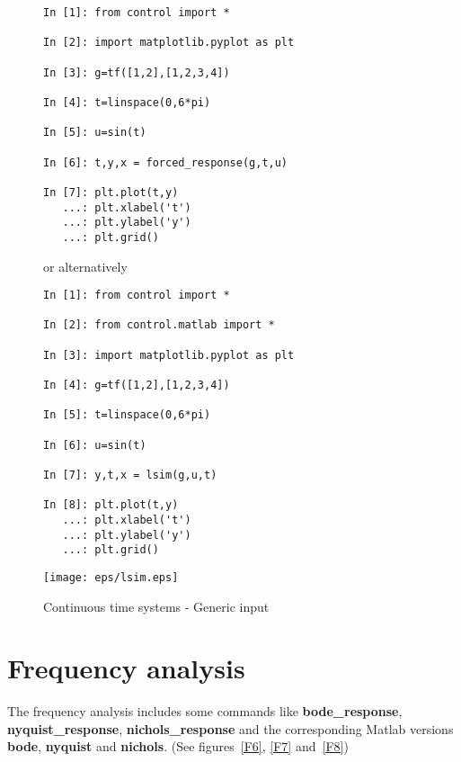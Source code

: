 \begin{figure}[htbp]  %
\begin{minipage}[t]{0.55\textwidth}
  \vspace{0pt}
\begin{lstlisting}[linewidth=7cm,xleftmargin=0cm]
In [1]: from control import *

In [2]: import matplotlib.pyplot as plt

In [3]: g=tf([1,2],[1,2,3,4])

In [4]: t=linspace(0,6*pi)

In [5]: u=sin(t)

In [6]: t,y,x = forced_response(g,t,u)

In [7]: plt.plot(t,y)
   ...: plt.xlabel('t')
   ...: plt.ylabel('y')
   ...: plt.grid()
\end{lstlisting}

or alternatively

\begin{lstlisting}[linewidth=7cm,xleftmargin=0cm]
In [1]: from control import *

In [2]: from control.matlab import *

In [3]: import matplotlib.pyplot as plt

In [4]: g=tf([1,2],[1,2,3,4])

In [5]: t=linspace(0,6*pi)

In [6]: u=sin(t)

In [7]: y,t,x = lsim(g,u,t)

In [8]: plt.plot(t,y)
   ...: plt.xlabel('t')
   ...: plt.ylabel('y')
   ...: plt.grid()
\end{lstlisting}
\end{minipage}%
\begin{minipage}[t]{0.5\textwidth}
  \vspace{0pt} \centering
  \texttt{[image: eps/lsim.eps]}
\end{minipage}
\caption{Continuous time systems - Generic input}
\label{F5}
\end{figure}

\newpage
\section{Frequency analysis}

The frequency analysis includes some commands like \textbf{bode\_response}, 
\textbf{nyquist\_response}, \textbf{nichols\_response} and the corresponding 
Matlab versions \textbf{bode}, \textbf{nyquist} and \textbf{nichols}. (See 
figures~\ref{F6}, \ref{F7} and~\ref{F8})

